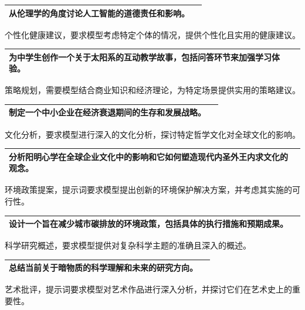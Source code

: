 \documentclass[12pt]{book}
\begin{document}
\begin{tabular}{|p{15cm}|p{3cm}|}
	\hline
从伦理学的角度讨论人工智能的道德责任和影响。\\
	\hline
\end{tabular}



\bigskip
个性化健康建议，要求模型考虑特定个体的情况，提供个性化且实用的健康建议。

\begin{tabular}{|p{15cm}|p{3cm}|}
	\hline
	为中学生创作一个关于太阳系的互动教学故事，包括问答环节来加强学习体验。\\
	\hline
\end{tabular}



\bigskip
策略规划，需要模型结合商业知识和经济理论，为特定场景提供实用的策略建议。

\begin{tabular}{|p{15cm}|p{3cm}|}
	\hline
制定一个中小企业在经济衰退期间的生存和发展战略。\\
	\hline
\end{tabular}


\bigskip
文化分析，要求模型进行深入的文化分析，探讨特定哲学文化对全球文化的影响。

\begin{tabular}{|p{15cm}|p{3cm}|}
	\hline
分析阳明心学在全球企业文化中的影响和它如何塑造现代内圣外王内求文化的观念。\\
	\hline
\end{tabular}


\bigskip
环境政策提案，提示词要求模型提出创新的环境保护解决方案，并考虑其实施的可行性。

\begin{tabular}{|p{15cm}|p{3cm}|}
	\hline
设计一个旨在减少城市碳排放的环境政策，包括具体的执行措施和预期成果。\\
	\hline
\end{tabular}



\bigskip
科学研究概述，要求模型提供对复杂科学主题的准确且深入的概述。

\begin{tabular}{|p{15cm}|p{3cm}|}
	\hline
总结当前关于暗物质的科学理解和未来的研究方向。\\
	\hline
\end{tabular}



\bigskip
艺术批评，提示词要求模型对艺术作品进行深入分析，并探讨它们在艺术史上的重要性。
\end{document}
